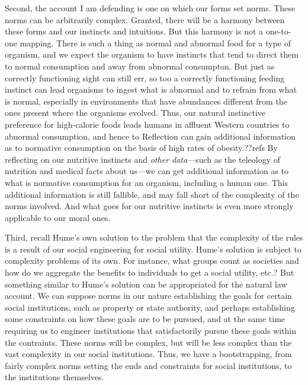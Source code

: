 Second, the account I am defending is one on which our forms set norms. These norms can be arbitrarily complex.
Granted, there will be a harmony between these forms and our instincts and intuitions. But this harmony is not
a one-to-one mapping. There is such a thing as normal and abnormal food for a type of organism, and we expect the organism
to have instincts that tend to direct them to normal consumption and away from abnormal consumpton. But just as correctly
functioning sight can still err, so too a correctly functioning feeding instinct can lead organisms to ingest
what is abnormal and to refrain from what is normal, especially in environments that have abundances different from the
ones present where the organisms evolved. Thus, our natural instinctive
preference for high-calorie foods leads humans in affluent Western countries to abnormal consumption, and hence to
Reflection can gain additional information as to normative consumption on the basis of
high rates of obesity.??refs By reflecting on our nutritive instincts and \textit{other data}---such as the teleology of
nutrition and medical facts about us---we can get additional information as to what is normative consumption for
an organism, including a human one. This additional information is still fallible, and may fall short of the complexity
of the norms involved. And what goes for our nutritive instincts is even more strongly applicable to our moral ones.

Third, recall Hume's own solution to the problem that the complexity of the rules is a result of our social engineering for social utility. 
Hume's solution is subject to complexity problems of its own. For
instance, what groups count as societies and how do we aggregate the benefits to individuals to get a social utility, etc.? 
But something similar to Hume's solution can be appropriated for the natural law account. We can suppose norms in our nature 
establishing the goals for certain social institutions, such as property or state authority, and perhaps establishing some 
constraints on how these goals are to be pursued, and at the same time requiring us to engineer institutions that satisfactorily
pursue these goals within the contraints. These norms will be complex, but will be less complex than the vast complexity in
our social institutions. Thus, we have a bootstrapping, from fairly complex norms setting the ends and constraints for social
institutions, to the institutions themselves.
\chaptertail 
